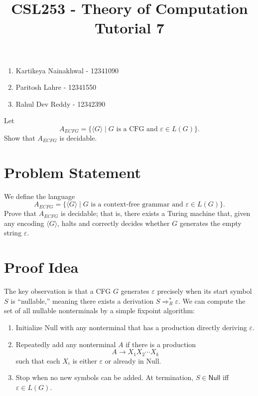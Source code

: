 \documentclass[12pt]{article}
\title{\Large\textbf{CSL253 - Theory of Computation}\\[0.5em]
	\large Tutorial 7}
\author{}
\date{}
\begin{document}
	
	\maketitle
	
	\begin{tcolorbox}[
		title=\textbf{Team Members},
		colback=white,
		colframe=statecol,
		arc=0mm
		]
		\begin{enumerate}[leftmargin=*]
			\item Kartikeya Nainakhwal - 12341090
			\item Paritosh Lahre - 12341550
			\item Rahul Dev Reddy - 12342390
		\end{enumerate}
	\end{tcolorbox}
	
	\begin{tcolorbox}[
		title=\textbf{Question: 2},
		colback=white,
		colframe=transitioncol,
		arc=0mm
		]
		Let 
		\[
		A_{ECFG} = \{\langle G \rangle \mid G \text{ is a CFG and } \varepsilon \in L(G)\}.
		\]
		Show that $A_{ECFG}$ is decidable.
	\end{tcolorbox}
	
	\vspace{1em}
	
	\section*{Problem Statement}
	We define the language
	\[
	A_{ECFG} = \{\langle G\rangle \mid G \text{ is a context-free grammar and } \varepsilon \in L(G)\}.
	\]
	Prove that $A_{ECFG}$ is decidable; that is, there exists a Turing machine that, given any encoding $\langle G\rangle$, halts and correctly decides whether $G$ generates the empty string $\varepsilon$.
	
	\section*{Proof Idea}
	The key observation is that a CFG $G$ generates $\varepsilon$ precisely when its start symbol $S$ is ``nullable,'' meaning there exists a derivation $S \Rightarrow^*_R \varepsilon$.  We can compute the set of all nullable nonterminals by a simple fixpoint algorithm:
	\begin{enumerate}[label=\arabic*.]
		\item Initialize \textsf{Null} with any nonterminal that has a production directly deriving $\varepsilon$.
		\item Repeatedly add any nonterminal $A$ if there is a production
		\[A \to X_1 X_2 \cdots X_k\]
		such that each $X_i$ is either $\varepsilon$ or already in \textsf{Null}.
		\item Stop when no new symbols can be added.  At termination, $S\in\textsf{Null}$ iff $\varepsilon\in L(G)$.
	\end{enumerate}
	
\end{document}

